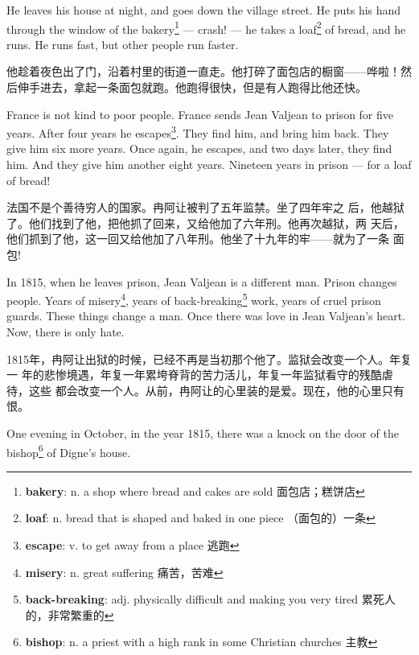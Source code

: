 \documentclass[fontset=ubuntu, zihao=5]{ctexart}
\begin{document}
\begin{paracol}{2}
  \switchcolumn

  He leaves his house at night, and goes down the village street. He puts
  his hand through the window of the bakery\footnote{\textbf{bakery}: n. a
    shop where bread and cakes are sold 面包店；糕饼店} --- crash! --- he
  takes a loaf\footnote{\textbf{loaf}: n. bread that is shaped and baked in
    one piece （面包的）一条} of bread, and he runs. He runs fast, but other
  people run faster.

  \switchcolumn

  他趁着夜色出了门，沿着村里的街道一直走。他打碎了面包店的橱窗——哗啦！然后伸手进去，拿起一条面包就跑。他跑得很快，但是有人跑得比他还快。

  \switchcolumn*

  France is not kind to poor people. France sends Jean Valjean to prison for
  five years. After four years he escapes\footnote{\textbf{escape}: v. to
    get away from a place 逃跑}. They find him, and bring him back. They
  give him six more years. Once again, he escapes, and two days later, they
  find him. And they give him another eight years. Nineteen years in prison
  --- for a loaf of bread!

  \switchcolumn

  法国不是个善待穷人的国家。冉阿让被判了五年监禁。坐了四年牢之
  后，他越狱了。他们找到了他，把他抓了回来，又给他加了六年刑。他再次越狱，两
  天后，他们抓到了他，这一回又给他加了八年刑。他坐了十九年的牢——就为了一条
  面包!

  \switchcolumn*

  In 1815, when he leaves prison, Jean Valjean is a different man. Prison
  changes people. Years of misery\footnote{\textbf{misery}: n. great
    suffering 痛苦，苦难}, years of
  back-breaking\footnote{\textbf{back-breaking}: adj. physically difficult
    and making you very tired 累死人的，非常繁重的} work, years of cruel
  prison guards. These things change a man. Once there was love in Jean
  Valjean's heart. Now, there is only hate.

  \switchcolumn

  1815年，冉阿让出狱的时候，已经不再是当初那个他了。监狱会改变一个人。年复一
  年的悲惨境遇，年复一年累垮脊背的苦力活儿，年复一年监狱看守的残酷虐待，这些
  都会改变一个人。从前，冉阿让的心里装的是爱。现在，他的心里只有
  恨。

  \switchcolumn*

  \sectionbreak

  One evening in October, in the year 1815, there was a knock on the door of
  the bishop\footnote{\textbf{bishop}: n. a priest with a high rank in some Christian churches 主教} of Digne's house.


\end{paracol}
\end{document}

